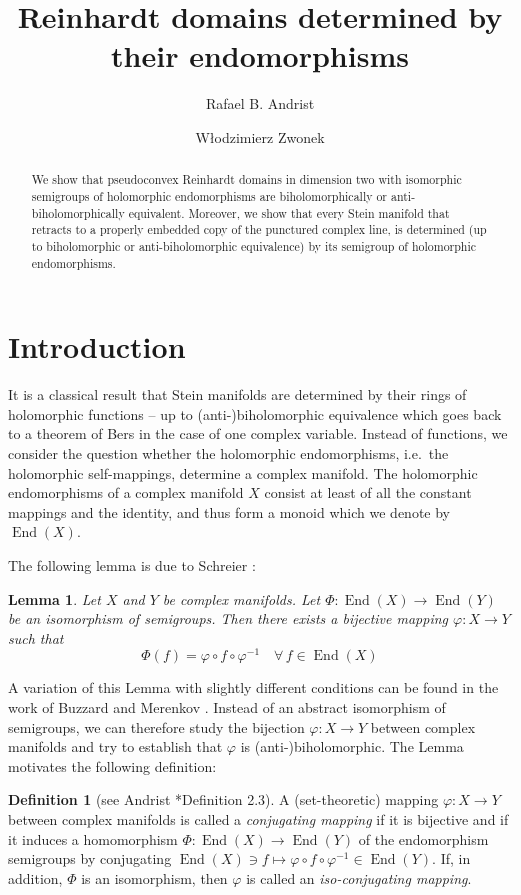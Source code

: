 \documentclass[a4paper,12pt]{amsart}
\title{Reinhardt domains determined by their endomorphisms}
\author{Rafael B. Andrist}
\author{W{\l}odzimierz Zwonek}
\DeclareMathOperator{\enmo}{End}
\newtheorem{lemma}[theorem]{Lemma}
\theoremstyle{definition}
\newtheorem{definition}[theorem]{Definition}
\begin{document}
\begin{abstract}
We show that pseudoconvex Reinhardt domains in dimension two with isomorphic semigroups of holomorphic endomorphisms are biholomorphically or anti-biholomorphically equivalent. Moreover, we show that every Stein manifold that retracts to a properly embedded copy of the punctured complex line, is determined (up to biholomorphic or anti-biholomorphic equivalence) by its semigroup of holomorphic endomorphisms. 
\end{abstract}

\maketitle

\section{Introduction}

It is a classical result that Stein manifolds are determined by their rings of holomorphic functions -- up to (anti-)biholomorphic equivalence which goes back to a theorem of Bers in the case of one complex variable. Instead of functions, we consider the question whether the holomorphic endomorphisms, i.e.\ the holomorphic self-mappings, determine a complex manifold. The holomorphic endomorphisms of a complex manifold $X$ consist at least of all the constant mappings and the identity, and thus form a monoid which we denote by $\enmo(X)$. 

The following lemma is due to Schreier \cite{02519973}:
\begin{lemma}
\label{lem-conjugation}
Let $X$ and $Y$ be complex manifolds. Let $\Phi \colon \enmo(X) \rightarrow \enmo(Y)$ be an isomorphism of semigroups.
Then there exists a bijective mapping $\varphi \colon X \rightarrow Y$ such that \[\Phi(f) = \varphi \circ f \circ \varphi^{-1} \quad \forall \, f \in \enmo(X)\]
\end{lemma}
A variation of this Lemma with slightly different conditions can be found in the work of Buzzard and Merenkov \cite{MR2010321}. Instead of an abstract isomorphism of semigroups, we can therefore study the bijection $\varphi \colon X \to Y$ between complex manifolds and try to establish that $\varphi$ is (anti-)biholomorphic. The Lemma motivates the following definition:
\begin{definition}[see Andrist \cite{MR2763719}*{Definition 2.3}]
A (set-theoretic) mapping $\varphi \colon X \to Y$ between complex manifolds is called a \textit{conjugating mapping} if it is bijective and if it induces a homomorphism $\Phi \colon \enmo(X) \to \enmo(Y)$ of the endomorphism semigroups by conjugating $\enmo(X) \ni f \mapsto \varphi \circ f \circ \varphi^{-1} \in \enmo(Y)$. If, in addition, $\Phi$ is an isomorphism, then $\varphi$ is called an \textit{iso-conjugating mapping}.
\end{definition}
\end{document}
